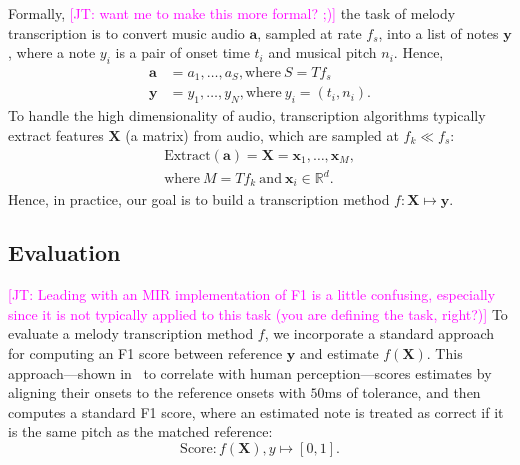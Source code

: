 \documentclass{article}
\newcommand{\fone}{F1}
\newcommand\john[1]{\textcolor{magenta}{[JT: #1]}}
\begin{document}
Formally, \john{want me to make this more formal? ;)} the task of melody transcription is to convert music audio $\bm{a}$, sampled at rate $f_s$, into a list of notes $\bm{y}$, where a note $y_i$ is a pair of onset time $t_i$ and musical pitch $n_i$. Hence, 
\begin{align*}
    \bm{a} &= a_1, \ldots, a_S, \text{where}~S = Tf_s \\
    \bm{y} &= y_1, \ldots, y_N, \text{where}~y_i = (t_i, n_i).
\end{align*}
To handle the high dimensionality of audio, transcription algorithms typically extract features $\bm{X}$ (a matrix) from audio, which are sampled at $f_k \ll f_s$:
\begin{align*}
    \text{Extract}(\bm{a}) = \bm{X} = \bm{x}_1, \ldots, \bm{x}_M, \\ 
    \text{where}~M = Tf_k~\text{and}~\bm{x}_i \in \mathbb{R}^d.
\end{align*}
Hence, in practice, our goal is to build a transcription method 
$f : \bm{X} \mapsto \bm{y}$.

\subsection{Evaluation}
\label{sec:eval}

\john{Leading with an MIR implementation of F1 is a little confusing, especially since it is not typically applied to this task (you are defining the task, right?)}
To evaluate a melody transcription method $f$, 
we incorporate a standard approach~\cite{raffel2014eval} for computing an \fone{} score between reference $\bm{y}$ and estimate $f(\bm{X})$. 
This approach---shown in~\cite{ycart2020investigating} to correlate with human perception---scores estimates by aligning their onsets to the reference onsets with $50$ms of tolerance, and then computes a standard \fone{} score, where an estimated note is treated as correct if it is the same pitch as the matched reference:
\begin{equation*}
    \text{Score} : f(\bm{X}), y \mapsto [0, 1].
\end{equation*}
\end{document}
